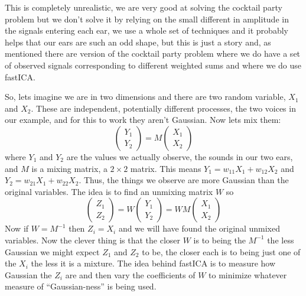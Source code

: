 \documentclass[12pt]{article}
\begin{document}
This is completely unrealistic, we are very good at solving the
cocktail party problem but we don't solve it by relying on the small
different in amplitude in the signals entering each ear, we use a
whole set of techniques and it probably helps that our ears are such
an odd shape, but this is just a story and, as mentioned there are
version of the cocktail party problem where we do have a set of
observed signals corresponding to different weighted sums and where we
do use fastICA.

So, lets imagine we are in two dimensions and there are two random
variable, $X_1$ and $X_2$. These are independent, potentially
different processes, the two voices in our example, and for this to
work they aren't Gaussian. Now lets mix them:
\begin{equation}
  \left(\begin{array}{c}Y_1\\Y_2\end{array}\right)=M \left(\begin{array}{c}X_1\\X_2\end{array}\right)
\end{equation}
where $Y_1$ and $Y_2$ are the values we actually observe, the sounds
in our two ears, and $M$ is a mixing matrix, a $2\times 2$
matrix. This means $Y_1=w_{11}X_1+w_{12}X_2$ and
$Y_2=w_{21}X_1+w_{22}X_2$. Thus, the things we observe are more
Gaussian than the original variables. The idea is to find an unmixing
matrix $W$ so
\begin{equation}
  \left(\begin{array}{c}Z_1\\Z_2\end{array}\right)=W \left(\begin{array}{c}Y_1\\Y_2\end{array}\right)=WM\left(\begin{array}{c}X_1\\X_2\end{array}\right)
\end{equation}
Now if $W=M^{-1}$ then $Z_i=X_i$ and we will have found the original
unmixed variables.  Now the clever thing is that the closer $W$ is to
being the $M^{-1}$ the less Gaussian we might expect $Z_1$ and $Z_2$
to be, the closer each is to being just one of the $X_i$ the less it
is a mixture. The idea behind fastICA is to measure how Gaussian the
$Z_i$ are and then vary the coefficients of $W$ to minimize whatever
measure of ``Gaussian-ness'' is being used.
\end{document}
